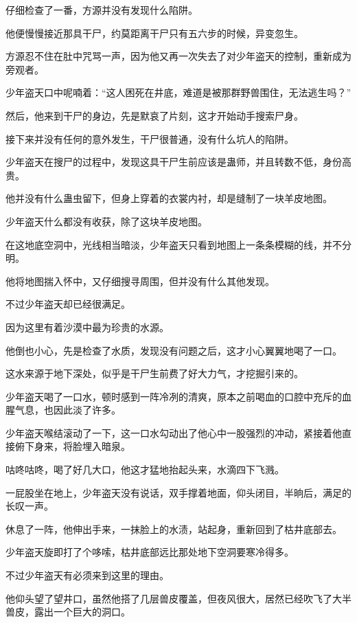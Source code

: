 
\begin{this_body}

仔细检查了一番，方源并没有发现什么陷阱。

他便慢慢接近那具干尸，约莫距离干尸只有五六步的时候，异变忽生。

方源忍不住在肚中咒骂一声，因为他又再一次失去了对少年盗天的控制，重新成为旁观者。

少年盗天口中呢喃着：“这人困死在井底，难道是被那群野兽围住，无法逃生吗？”

然后，他来到干尸的身边，先是默哀了片刻，这才开始动手搜索尸身。

接下来并没有任何的意外发生，干尸很普通，没有什么坑人的陷阱。

少年盗天在搜尸的过程中，发现这具干尸生前应该是蛊师，并且转数不低，身份高贵。

他并没有什么蛊虫留下，但身上穿着的衣裳内衬，却是缝制了一块羊皮地图。

少年盗天什么都没有收获，除了这块羊皮地图。

在这地底空洞中，光线相当暗淡，少年盗天只看到地图上一条条模糊的线，并不分明。

他将地图揣入怀中，又仔细搜寻周围，但并没有什么其他发现。

不过少年盗天却已经很满足。

因为这里有着沙漠中最为珍贵的水源。

他倒也小心，先是检查了水质，发现没有问题之后，这才小心翼翼地喝了一口。

这水来源于地下深处，似乎是干尸生前费了好大力气，才挖掘引来的。

少年盗天喝了一口水，顿时感到一阵冷冽的清爽，原本之前喝血的口腔中充斥的血腥气息，也因此淡了许多。

少年盗天喉结滚动了一下，这一口水勾动出了他心中一股强烈的冲动，紧接着他直接俯下身来，将脸埋入暗泉。

咕咚咕咚，喝了好几大口，他这才猛地抬起头来，水滴四下飞溅。

一屁股坐在地上，少年盗天没有说话，双手撑着地面，仰头闭目，半晌后，满足的长叹一声。

休息了一阵，他伸出手来，一抹脸上的水渍，站起身，重新回到了枯井底部去。

少年盗天旋即打了个哆嗦，枯井底部远比那处地下空洞要寒冷得多。

不过少年盗天有必须来到这里的理由。

他仰头望了望井口，虽然他搭了几层兽皮覆盖，但夜风很大，居然已经吹飞了大半兽皮，露出一个巨大的洞口。


\end{this_body}
